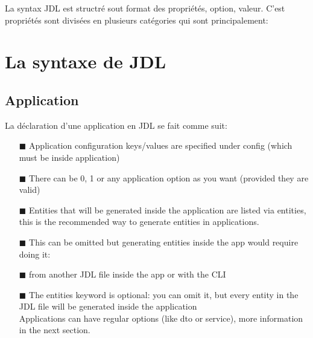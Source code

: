 La syntax JDL est structré sout format des propriétés, option, valeur.
C'est propriétés sont divisées en plusieurs catégories qui sont
principalement:

\section{La syntaxe de JDL}

\subsection{Application}

La déclaration d'une application en JDL se fait comme suit:

\begin{Shaded}
\begin{Highlighting}[]
\NormalTok{  \}}
\NormalTok{\}}
\end{Highlighting}
\end{Shaded}

\begin{itemize}
\item[$\blacksquare$]
  Application configuration keys/values are specified under config
  (which must be inside application)
\item[$\blacksquare$]
  There can be 0, 1 or any application option as you want (provided they
  are valid)
\item[$\blacksquare$]
  Entities that will be generated inside the application are listed via
  entities, this is the recommended way to generate entities in
  applications.
\item[$\blacksquare$]
  This can be omitted but generating entities inside the app would
  require doing it:
\item[$\blacksquare$]
  from another JDL file inside the app or with the CLI
\item[$\blacksquare$]
  The entities keyword is optional: you can omit it, but every entity in
  the JDL file will be generated inside the application\\
  Applications can have regular options (like dto or service), more
  information in the next section.
\end{itemize}

